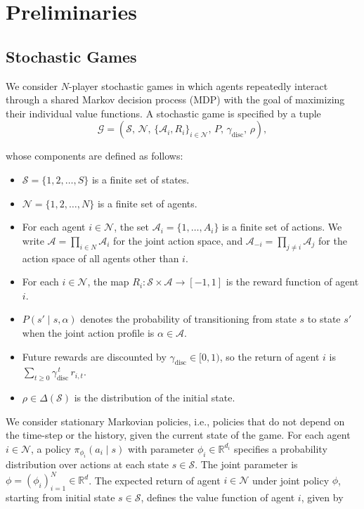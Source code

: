 \documentclass{nextgame2026} %
\begin{document}
\section{Preliminaries}\label{sec:setup}

\subsection{Stochastic Games}

We consider $N$-player stochastic games in which agents repeatedly interact through a shared Markov decision process (MDP) with the goal of maximizing their individual value functions. A stochastic game is specified by a tuple 
\[
\mathcal{G} = \left(\mathcal{S},\, \mathcal{N},\, \{\mathcal{A}_i, R_i\}_{i \in \mathcal{N}},\, P,\, \gamma_{\mathrm{disc}},\, \rho\right),
\]

whose components are defined as follows:

\begin{itemize}
    \item $\mathcal{S} = \{1, 2, \ldots, S\}$ is a finite set of states.
    \item $\mathcal{N} = \{1, 2, \ldots, N\}$ is a finite set of agents.
    \item For each agent $i \in \mathcal{N}$, the set $\mathcal{A}_i = \{1, \ldots, A_i\}$ is a finite set of actions. We write $\mathcal{A} = \prod_{i \in N} \mathcal{A}_i$ for the joint action space, and $\mathcal{A}_{-i} = \prod_{j \neq i} \mathcal{A}_j$ for the action space of all agents other than $i$.
    \item For each $i \in \mathcal{N}$, the map $R_i \colon \mathcal{S} \times \mathcal{A} \to [-1, 1]$ is the reward function of agent $i$.
    \item $P(s' \mid s, \alpha)$ denotes the probability of transitioning from state $s$ to state $s'$ when the joint action profile is $\alpha \in \mathcal{A}$.
    \item Future rewards are discounted by $\gamma_{\mathrm{disc}} \in [0,1)$, so the return of agent $i$ is $\sum_{t \geq 0} \gamma_{\mathrm{disc}}^{\,t} \, r_{i,t}$. 
    \item $\rho \in \Delta(\mathcal{S})$ is the distribution of the initial state.
\end{itemize}


We consider stationary Markovian policies, i.e., policies that 
do not depend on the time-step or the history, given the current state 
of the game. For each agent $i \in \mathcal{N}$, a policy 
$\pi_{\phi_i}(a_i \mid s)$ with parameter $\phi_i \in \mathbb{R}^{d_i}$ 
specifies a probability distribution over actions at each state 
$s \in \mathcal{S}$. The joint parameter is $\phi = (\phi_i)_{i=1}^N 
\in \mathbb{R}^d$. The expected return of agent $i \in \mathcal{N}$ 
under joint policy $\phi$, starting from initial state $s \in \mathcal{S}$, 
defines the value function of agent $i$, given by 
\end{document}
